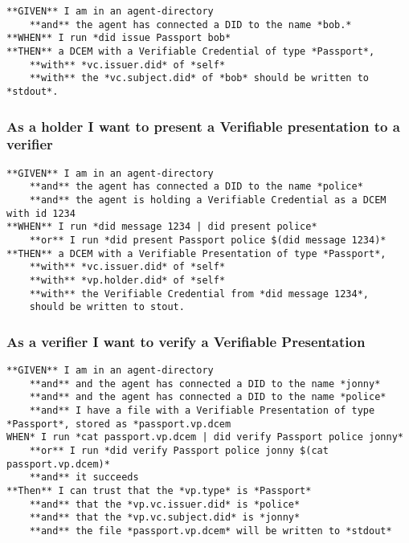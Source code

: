 \begin{lstlisting}
**GIVEN** I am in an agent-directory
    **and** the agent has connected a DID to the name *bob.*
**WHEN** I run *did issue Passport bob*
**THEN** a DCEM with a Verifiable Credential of type *Passport*, 
    **with** *vc.issuer.did* of *self*
    **with** the *vc.subject.did* of *bob* should be written to *stdout*.
\end{lstlisting}

\hypertarget{as-a-holder-i-want-to-present-a-verifiable-presentation-to-a-verifier}{%
\subsubsection{As a holder I want to present a Verifiable presentation
to a
verifier}\label{as-a-holder-i-want-to-present-a-verifiable-presentation-to-a-verifier}}

\begin{lstlisting}
**GIVEN** I am in an agent-directory
    **and** the agent has connected a DID to the name *police*
    **and** the agent is holding a Verifiable Credential as a DCEM with id 1234
**WHEN** I run *did message 1234 | did present police*
    **or** I run *did present Passport police $(did message 1234)*
**THEN** a DCEM with a Verifiable Presentation of type *Passport*, 
    **with** *vc.issuer.did* of *self*
    **with** *vp.holder.did* of *self*
    **with** the Verifiable Credential from *did message 1234*, 
    should be written to stout.
\end{lstlisting}

\hypertarget{as-a-verifier-i-want-to-verify-a-verifiable-presentation}{%
\subsubsection{As a verifier I want to verify a Verifiable
Presentation}\label{as-a-verifier-i-want-to-verify-a-verifiable-presentation}}

\begin{lstlisting}
**GIVEN** I am in an agent-directory
    **and** and the agent has connected a DID to the name *jonny*
    **and** and the agent has connected a DID to the name *police*
    **and** I have a file with a Verifiable Presentation of type *Passport*, stored as *passport.vp.dcem
WHEN* I run *cat passport.vp.dcem | did verify Passport police jonny*
    **or** I run *did verify Passport police jonny $(cat passport.vp.dcem)*
    **and** it succeeds
**Then** I can trust that the *vp.type* is *Passport*
    **and** that the *vp.vc.issuer.did* is *police*
    **and** that the *vp.vc.subject.did* is *jonny*
    **and** the file *passport.vp.dcem* will be written to *stdout*
\end{lstlisting}


